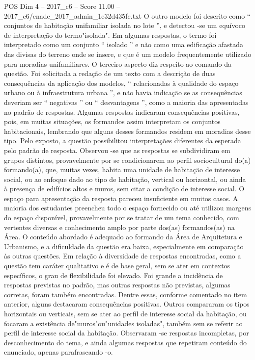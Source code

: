 \begin{textsample}{POS Dim 4 – 2017\_c6 – Score 11.00 – 2017\_c6/enade\_2017\_admin\_1e32d435fe.txt}
O outro modelo foi descrito como “ conjuntos de habitação unifamiliar isolada no lote ”, e detectou -se um equívoco de interpretação do termo"isolada".
Em algumas respostas, o termo foi interpretado como um conjunto “ isolado ” e não como uma edificação afastada das divisas do terreno onde se insere, e que é um modelo frequentemente utilizado para moradias unifamiliares.
O terceiro aspecto diz respeito ao comando da questão.
Foi solicitada a redação de um texto com a descrição de duas consequências da aplicação dos modelos, “ relacionadas à qualidade do espaço urbano ou à infraestrutura urbana ”, e não havia indicação se as consequências deveriam ser “ negativas ” ou “ desvantagens ”, como a maioria das apresentadas no padrão de respostas.
Algumas respostas indicaram consequências positivas, pois, em muitas situações, os formandos assim interpretam os conjuntos habitacionais, lembrando que alguns desses formandos residem em moradias desse tipo.
Pelo exposto, a questão possibilitou interpretações diferentes da esperada pelo padrão de resposta.
Observou -se que as respostas se subdividiram em grupos distintos, provavelmente por se condicionarem ao perfil sociocultural do(a) formando(a), que, muitas vezes, habita uma unidade de habitação de interesse social, ou ao enfoque dado ao tipo de habitação, vertical ou horizontal, ou ainda à presença de edifícios altos e muros, sem citar a condição de interesse social.
O espaço para apresentação da resposta pareceu insuficiente em muitos casos.
A maioria dos estudantes preencheu todo o espaço fornecido ou até utilizou margens do espaço disponível, provavelmente por se tratar de um tema conhecido, com vertentes diversas e conhecimento amplo por parte dos(as) formandos(as) na Área.
O conteúdo abordado é adequado ao formando da Área de Arquitetura e Urbanismo, e a dificuldade da questão era baixa, especialmente em comparação às outras questões.
Em relação à diversidade de respostas encontradas, como a questão tem caráter qualitativo e é de base geral, sem se ater em contextos específicos, o grau de flexibilidade foi elevado.
Foi grande a incidência de respostas previstas no padrão, mas outras respostas não previstas, algumas corretas, foram também encontradas.
Dentre essas, conforme comentado no item anterior, alguns destacaram consequências positivas.
Outros compararam os tipos horizontais ou verticais, sem se ater ao perfil de interesse social da habitação, ou focaram a existência de"muros"ou"unidades isoladas", também sem se referir ao perfil de interesse social da habitação.
Observaram -se respostas incompletas, por desconhecimento do tema, e ainda algumas respostas que repetiram conteúdo do enunciado, apenas parafraseando -o.

\end{textsample}
